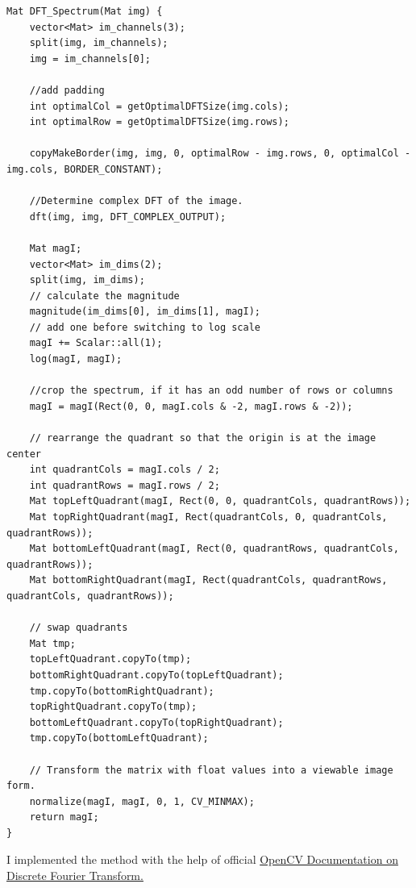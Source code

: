 \documentclass{article}
\begin{document}
\begin{lstlisting}[caption={My implementation of DTF\_Spectrum method.},captionpos=b]
Mat DFT_Spectrum(Mat img) {
	vector<Mat> im_channels(3);
	split(img, im_channels);
	img = im_channels[0];
	
	//add padding
	int optimalCol = getOptimalDFTSize(img.cols);
	int optimalRow = getOptimalDFTSize(img.rows);

	copyMakeBorder(img, img, 0, optimalRow - img.rows, 0, optimalCol - img.cols, BORDER_CONSTANT);

	//Determine complex DFT of the image.
	dft(img, img, DFT_COMPLEX_OUTPUT);
	
	Mat magI;	
	vector<Mat> im_dims(2);
	split(img, im_dims);
	// calculate the magnitude
	magnitude(im_dims[0], im_dims[1], magI);
	// add one before switching to log scale
	magI += Scalar::all(1);
	log(magI, magI);

	//crop the spectrum, if it has an odd number of rows or columns
	magI = magI(Rect(0, 0, magI.cols & -2, magI.rows & -2));
	
	// rearrange the quadrant so that the origin is at the image center
	int quadrantCols = magI.cols / 2;
	int quadrantRows = magI.rows / 2;
	Mat topLeftQuadrant(magI, Rect(0, 0, quadrantCols, quadrantRows));
	Mat topRightQuadrant(magI, Rect(quadrantCols, 0, quadrantCols, quadrantRows));
	Mat bottomLeftQuadrant(magI, Rect(0, quadrantRows, quadrantCols, quadrantRows));
	Mat bottomRightQuadrant(magI, Rect(quadrantCols, quadrantRows, quadrantCols, quadrantRows));

	// swap quadrants
	Mat tmp;                           
	topLeftQuadrant.copyTo(tmp);
	bottomRightQuadrant.copyTo(topLeftQuadrant);
	tmp.copyTo(bottomRightQuadrant);
	topRightQuadrant.copyTo(tmp);
	bottomLeftQuadrant.copyTo(topRightQuadrant);
	tmp.copyTo(bottomLeftQuadrant);

	// Transform the matrix with float values into a viewable image form.
	normalize(magI, magI, 0, 1, CV_MINMAX);
	return magI;
}
\end{lstlisting}

I implemented the method with the help of official \href{https://docs.opencv.org/2.4/doc/tutorials/core/discrete_fourier_transform/discrete_fourier_transform.html}{OpenCV Documentation on Discrete Fourier Transform.}
\newpage
\end{document}
